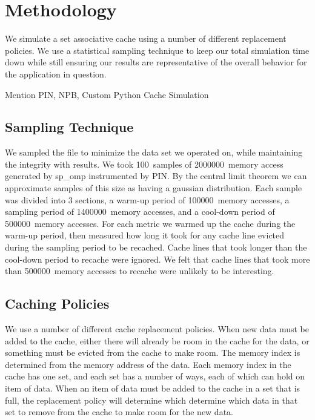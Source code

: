 \newcommand{\SAMPN}{100}
\newcommand{\SAMPK}{2000000}
\newcommand{\SAMP}{1400000}
\newcommand{\WARM}{100000}
\newcommand{\COOL}{500000}
\newcommand{\comment}[1]{}

\section{Methodology}
We simulate a set associative cache using a number of different
replacement policies.
We use a statistical sampling technique to keep our total simulation
time down while still ensuring our results are representative of the
overall behavior for the application in question.

Mention PIN, NPB, Custom Python Cache Simulation

\subsection{Sampling Technique}
We sampled the file to minimize the data set we operated on, while maintaining the integrity with results.
	We took \SAMPN~samples of \SAMPK~memory access generated by sp\_omp instrumented by PIN.
	By the central limit theorem we can approximate samples of this size as having a gaussian distribution.
	Each sample was divided into 3 sections, a warm-up period of \WARM~memory accesses,
		a sampling period of \SAMP~memory accesses, and a cool-down period of \COOL~memory accesses.
	For each metric we warmed up the cache during the warm-up period,
		then measured how long it took for any cache line evicted during the sampling period to be recached.
	Cache lines that took longer than the cool-down period to recache were ignored.
	We felt that cache lines that took more than \COOL~memory accesses to recache were unlikely to be interesting.

\subsection{Caching Policies}
\label{sec:policies}

We use a number of different cache replacement policies.  When new data must be added to the cache, either there will already be room in the cache for the data, or something must be evicted from the cache to make room.  The memory index is determined from the memory address of the data.  Each memory index in the cache has one set, and each set has a number of ways, each of which can hold on item of data.  When an item of data must be added to the cache in a set that is full, the replacement policy will determine which determine which data in that set to remove from the cache to make room for the new data.

